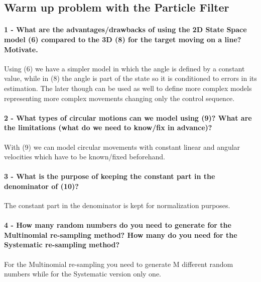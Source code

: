 \documentclass[12pt]{article}
\begin{document}
\subsection{Warm up problem with the Particle Filter}

\paragraph{1 - What are the advantages/drawbacks of using the 2D State Space model (6) compared to the 3D (8) for the target moving on a line? Motivate.}
Using (6) we have a simpler model in which the angle is defined by a constant value, while in (8) the angle is part of the state so it is conditioned to errors in its estimation. The later though can be used as well to define more complex models representing more complex movements changing only the control sequence.

\paragraph{2 - What types of circular motions can we model using (9)? What are the limitations (what do we need to know/fix in advance)?}
With (9) we can model circular movements with constant linear and angular velocities which have to be known/fixed beforehand.

\paragraph{3 - What is the purpose of keeping the constant part in the denominator of (10)?}
The constant part in the denominator is kept for normalization purposes.

\paragraph{4 - How many random numbers do you need to generate for the Multinomial re-sampling method? How many do you need for the Systematic re-sampling method?}
For the Multinomial re-sampling you need to generate M different random numbers while for the Systematic version only one.
\end{document}
